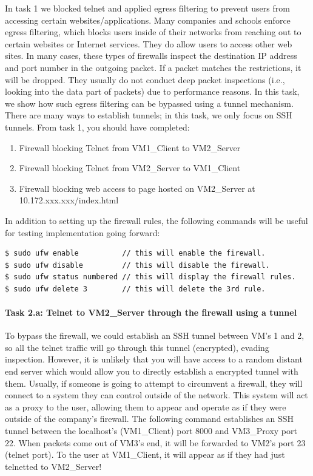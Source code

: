 In task 1 we blocked telnet and applied egress filtering to prevent users from accessing certain websites/applications. Many companies and schools enforce egress filtering, which blocks users inside of their networks from reaching out to certain websites or Internet services. They do allow users to access other web sites. 
In many cases, these types of firewalls inspect the destination IP address and port number in the outgoing packet. If a packet matches the restrictions, it will be dropped. They usually do not conduct deep packet inspections (i.e., looking into
the data part of packets) due to performance reasons. 
In this task, we show how such egress filtering can be bypassed using
a tunnel mechanism. There are many ways to establish tunnels; 
in this task, we only focus on SSH tunnels.
From task 1, you should have completed:
\begin{enumerate}
\item Firewall blocking Telnet from VM1\_Client to VM2\_Server
\item Firewall blocking Telnet from VM2\_Server to VM1\_Client
\item Firewall blocking web access to page hosted on VM2\_Server at 10.172.xxx.xxx/index.html
\end{enumerate}

In addition to setting up the firewall rules, the following commands will be useful for testing implementation going forward: 
\begin{Verbatim}[frame=single] 
$ sudo ufw enable          // this will enable the firewall. 
$ sudo ufw disable         // this will disable the firewall. 
$ sudo ufw status numbered // this will display the firewall rules. 
$ sudo ufw delete 3        // this will delete the 3rd rule.
\end{Verbatim}




\paragraph{Task 2.a: Telnet to VM2\_Server through the firewall using a tunnel}

To bypass the firewall, we could establish an SSH tunnel between
VM's 1 and 2, so all the telnet traffic will go through this tunnel
(encrypted), evading  inspection. However, it is unlikely that you will have access to a random distant end server which would allow you to directly establish a encrypted tunnel with them. Usually, if someone is going to attempt to circumvent a firewall, they will connect to a system they can control outside of the network. This system will act as a proxy to the user, allowing them to appear and operate as if they were outside of the company's firewall.  The following command 
establishes an SSH tunnel between the localhost's (VM1\_Client) port 8000 and 
VM3\_Proxy port 22. When packets come out of VM3's end, it will
be forwarded to VM2's port 23 (telnet port). To the user at VM1\_Client, it will appear as if they had just telnetted to VM2\_Server!

